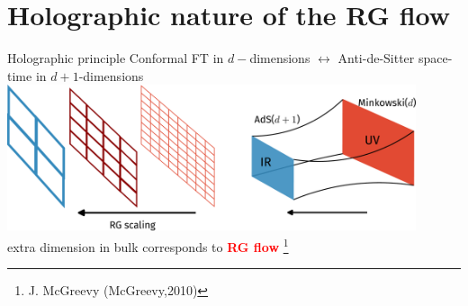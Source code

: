 \documentclass[12pt,aspectratio=169]{beamer}
\newcommand{\focus}[1]{\textcolor{red}{\bf{#1}}}
\begin{document}
\section{Holographic nature of the RG flow}
\begin{frame}{Holographic principle}
Conformal FT in \(d-\)dimensions \(\longleftrightarrow\) Anti-de-Sitter space-time in \(d+1\)-dimensions\\[10pt]
\includegraphics[width=0.9\textwidth]{figures/holography.pdf}\\[10pt]
extra dimension in bulk corresponds to \focus{RG flow}
\footnote{J. McGreevy (McGreevy,2010)}
\end{frame}
\end{document}
